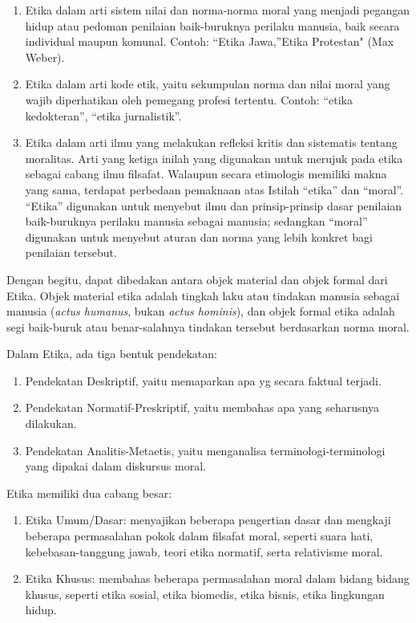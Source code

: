 \documentclass[11pt,twoside,a5paper,openany]{memoir}
\def\tightlist{}
\begin{document}
\begin{enumerate}
\def\labelenumi{\arabic{enumi}.}
\tightlist
\item
  Etika dalam arti sistem nilai dan norma-norma moral yang menjadi
  pegangan hidup atau pedoman penilaian baik-buruknya perilaku manusia,
  baik secara individual maupun komunal. Contoh: ``Etika Jawa,''Etika
  Protestan" (Max Weber).
\item
  Etika dalam arti kode etik, yaitu sekumpulan norma dan nilai moral
  yang wajib diperhatikan oleh pemegang profesi tertentu. Contoh:
  ``etika kedokteran'', ``etika jurnalistik''.
\item
  Etika dalam arti ilmu yang melakukan refleksi kritis dan sistematis
  tentang moralitas. Arti yang ketiga inilah yang digunakan untuk
  merujuk pada etika sebagai cabang ilmu filsafat. Walaupun secara
  etimologis memiliki makna yang sama, terdapat perbedaan pemaknaan atas
  Istilah ``etika'' dan ``moral''. ``Etika'' digunakan untuk menyebut
  ilmu dan prinsip-prinsip dasar penilaian baik-buruknya perilaku
  manusia sebagai manusia; sedangkan ``moral'' digunakan untuk menyebut
  aturan dan norma yang lebih konkret bagi penilaian tersebut.
\end{enumerate}

Dengan begitu, dapat dibedakan antara objek material dan objek formal
dari Etika. Objek material etika adalah tingkah laku atau tindakan
manusia sebagai manusia (\emph{actus humanus}, bukan \emph{actus
hominis}), dan objek formal etika adalah segi baik-buruk atau
benar-salahnya tindakan tersebut berdasarkan norma moral.

Dalam Etika, ada tiga bentuk pendekatan:

\begin{enumerate}
\def\labelenumi{\arabic{enumi}.}
\tightlist
\item
  Pendekatan Deskriptif, yaitu memaparkan apa yg secara faktual terjadi.
\item
  Pendekatan Normatif-Preskriptif, yaitu membahas apa yang seharusnya
  dilakukan.
\item
  Pendekatan Analitis-Metaetis, yaitu menganalisa
  terminologi-terminologi yang dipakai dalam diskursus moral.
\end{enumerate}

Etika memiliki dua cabang besar:

\begin{enumerate}
\def\labelenumi{\arabic{enumi}.}
\tightlist
\item
  Etika Umum/Dasar: menyajikan beberapa pengertian dasar dan mengkaji
  beberapa permasalahan pokok dalam filsafat moral, seperti suara hati,
  kebebasan-tanggung jawab, teori etika normatif, serta relativisme
  moral.
\item
  Etika Khusus: membahas beberapa permasalahan moral dalam bidang bidang
  khusus, seperti etika sosial, etika biomedis, etika bisnis, etika
  lingkungan hidup.
\end{enumerate}
\end{document}

